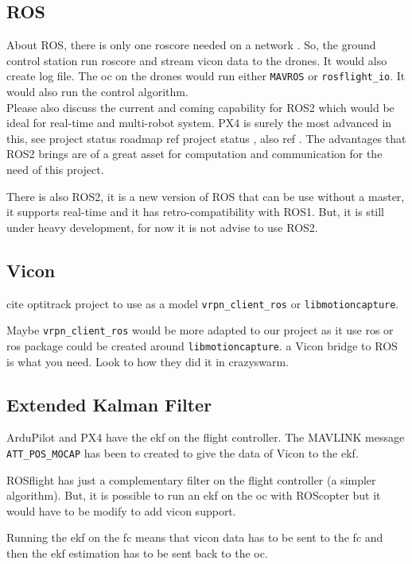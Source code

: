 \subsection{ROS}
About ROS, there is only one roscore needed on a network \cite{stackoverflow_multi_machine}.
So, the ground control station run roscore and stream vicon data to the drones. It would also create log file.
The \gls{oc} on the drones would run either \texttt{MAVROS} or \texttt{rosflight\_io}.
It would also run the control algorithm.
{\color{red} \\Please also discuss the current and coming capability for ROS2 which would be ideal for real-time and multi-robot system. PX4 is surely the most advanced in this, see project status roadmap ref project status \cite{px4}, also ref \cite{ros_wiki_ng_drones}. The advantages that ROS2 brings are of a great asset for computation and communication for the need of this project.\\}

There is also ROS2, it is a new version of ROS that can be use without a master, it supports real-time and it has retro-compatibility with ROS1. But, it is still under heavy development, for now it is not advise to use ROS2.

\subsection{Vicon}
{\color{red} cite optitrack project to use as a model}
\texttt{vrpn\_client\_ros} or \texttt{libmotioncapture}.

Maybe \texttt{vrpn\_client\_ros} would be more adapted to our project as it use ros or ros package could be created around \texttt{libmotioncapture}.
{\color{red}a Vicon bridge to ROS is what you need. Look to how they did it in crazyswarm.}

\subsection{Extended Kalman Filter}
ArduPilot and PX4 have the \gls{ekf} on the flight controller.
The MAVLINK message \texttt{ATT\_POS\_MOCAP} has been to created to give the data of Vicon to the \gls{ekf}.

ROSflight has just a complementary filter on the flight controller (a simpler algorithm).
But, it is possible to run an \gls{ekf} on the \gls{oc} with ROScopter but it would have to be modify to add vicon support.

Running the \gls{ekf} on the \gls{fc} means that vicon data has to be sent to the \gls{fc} and then the \gls{ekf} estimation has to be sent back to the \gls{oc}.

